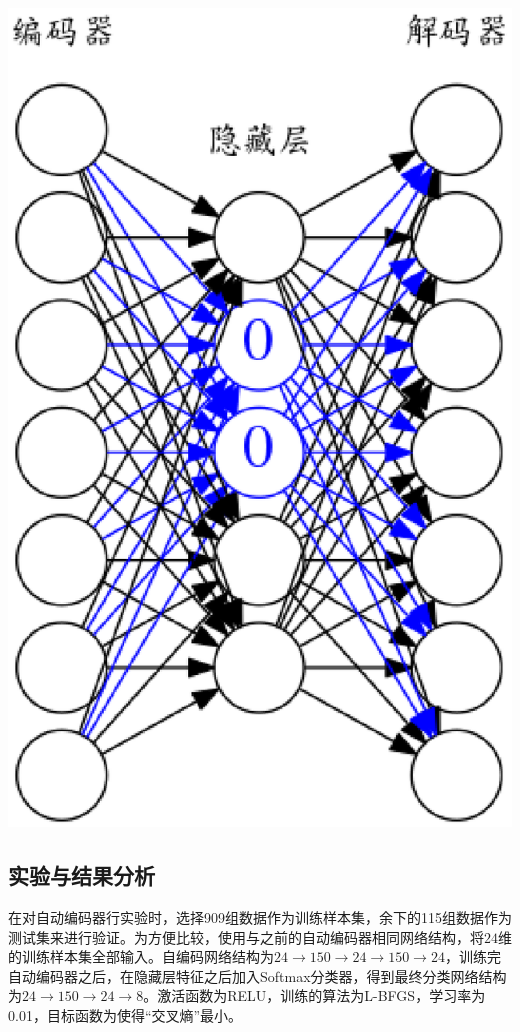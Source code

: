 \documentclass{ctacn}%
\begin{document}
\begin{multicols}{2}
\begin{center}
	\includegraphics[scale=0.16, trim=0 0 0 0]{figs/denoised_autoencoder}\\
	\label{fig8}
\end{center}

\subsection{实验与结果分析}

在对自动编码器行实验时，选择909组数据作为训练样本集，余下的115组数据作为测试集来进行验证。为方便比较，使用与之前的自动编码器相同网络结构，将$24$维的训练样本集全部输入。自编码网络结构为$24\rightarrow150\rightarrow24\rightarrow150\rightarrow24$，训练完自动编码器之后，在隐藏层特征之后加入Softmax分类器，得到最终分类网络结构为$24\rightarrow150\rightarrow24\rightarrow8$。激活函数为RELU，训练的算法为L-BFGS，学习率为0.01，目标函数为使得“交叉熵”最小。


\end{multicols}
\end{document}
